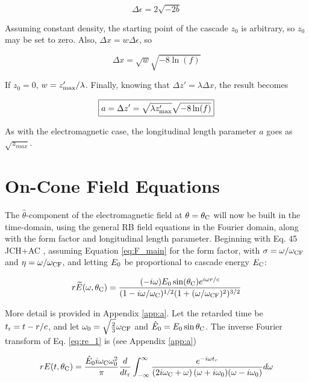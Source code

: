 \documentclass[amsmath,amssymb,aps,prd,10pt,twocolumn]{revtex4}
\begin{document}
\begin{equation}
\Delta \epsilon = 2\sqrt{-2b}
\end{equation}

Assuming constant density, the starting point of the cascade $z_0$ is arbitrary, so $z_0$ may be set to zero.  Also, $\Delta x = w\Delta \epsilon$, so

\begin{equation}
\Delta x = \sqrt{w} \sqrt{-8 \ln(f)}
\end{equation}

If $z_0 = 0$, $w = z'_{\rm max}/\lambda$.  Finally, knowing that $\Delta z' = \lambda \Delta x$, the result becomes

\begin{equation}
\boxed{
a = \Delta z' = \sqrt{\lambda z'_{\rm max}} \sqrt{-8 \ln(f)}
} \label{eq:main_2}
\end{equation}

As with the electromagnetic case, the longitudinal length parameter $a$ goes as $\sqrt{z_{max}}$.

\section{On-Cone Field Equations}
\label{sec:onc}

The $\hat{\theta}$-component of the electromagnetic field at $\theta = \theta_{\rm C}$ will now be built in the time-domain, using the general RB field equations in the Fourier domain, along with the form factor and longitudinal length parameter.  Beginning with Eq. 45 JCH+AC \cite{10.1016/j.astropartphys.2017.03.008}, assuming Equation \ref{eq:F_main} for the form factor, with $\sigma = \omega/\omega_{\rm CF}$ and $\eta = \omega/\omega_{\rm CF}$, and letting $E_{\rm 0}$ be proportional to cascade energy $E_{\rm C}$:

\begin{equation}
r\widetilde{E}(\omega,\theta_{\rm C}) = \frac{(-i\omega) E_0 \sin(\theta_{\rm C}) e^{i\omega r/c}}{(1-i \omega/\omega_{\rm C})^{1/2} (1+(\omega/\omega_{\rm CF})^2)^{3/2}} \label{eq:re_1}
\end{equation}

More detail is provided in Appendix \ref{app:a}. Let the retarded time be $t_{\rm r} = t - r/c$, and let $\omega_0 = \sqrt{\frac{2}{3	}}\omega_{\rm CF}$ and $\hat{E}_{\rm 0} = E_{\rm 0} \sin\theta_{\rm C}$.  The inverse Fourier transform of Eq. \ref{eq:re_1} is (see Appendix \ref{app:a})

\begin{widetext}
\begin{equation}
r E(t,\theta_{\rm C}) = \frac{\hat{E}_0 i \omega_{\rm C} \omega_{\rm 0}^2}{\pi} \frac{d}{dt_{\rm r}}\int_{-\infty}^{\infty} \frac{ e^{-i\omega t_r}}{ \left(2 i \omega_{\rm C} + \omega \right) (\omega+i\omega_{\rm 0}) (\omega - i\omega_{\rm 0}) } d\omega \label{eq:part1}
\end{equation}
\end{widetext}
\end{document}
